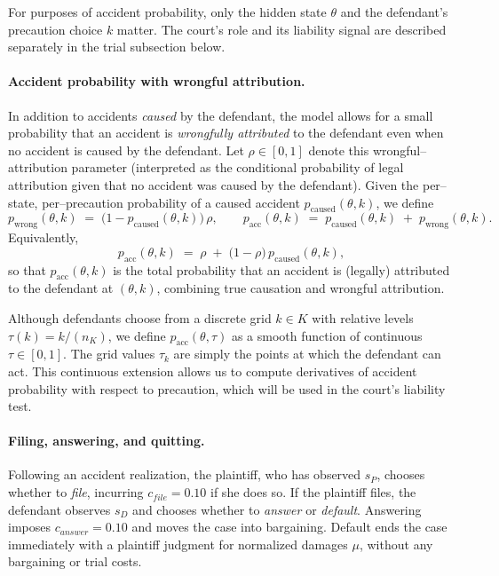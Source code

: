 \documentclass{article}
\begin{document}
For purposes of accident probability, only the hidden state $\theta$ and the defendant’s precaution choice $k$ matter. The court’s role and its liability signal are described separately in the trial subsection below.

\paragraph{Accident probability with wrongful attribution.}
In addition to accidents \emph{caused} by the defendant, the model allows for a small probability that an accident is \emph{wrongfully attributed} to the defendant even when no accident is caused by the defendant. Let $\rho\in[0,1]$ denote this wrongful–attribution parameter (interpreted as the conditional probability of legal attribution given that no accident was caused by the defendant). Given the per–state, per–precaution probability of a caused accident $p_{\mathrm{caused}}(\theta,k)$, we define
\[
p_{\mathrm{wrong}}(\theta,k)\;=\;\bigl(1 - p_{\mathrm{caused}}(\theta,k)\bigr)\,\rho,
\qquad
p_{\mathrm{acc}}(\theta,k)\;=\;p_{\mathrm{caused}}(\theta,k)\;+\;p_{\mathrm{wrong}}(\theta,k).
\]
Equivalently,
\[
p_{\mathrm{acc}}(\theta,k)
\;=\;\rho \;+\; \bigl(1-\rho\bigr)\,p_{\mathrm{caused}}(\theta,k),
\]
so that $p_{\mathrm{acc}}(\theta,k)$ is the total probability that an accident is (legally) attributed to the defendant at $(\theta,k)$, combining true causation and wrongful attribution.

Although defendants choose from a discrete grid $k \in K$ with relative levels $\tau(k)=k/(n_K)$, we define $p_{\mathrm{acc}}(\theta,\tau)$ as a smooth function of continuous $\tau\in[0,1]$. The grid values $\tau_k$ are simply the points at which the defendant can act. This continuous extension allows us to compute derivatives of accident probability with respect to precaution, which will be used in the court’s liability test.

\paragraph{Filing, answering, and quitting.}
Following an accident realization, the plaintiff, who has observed $s_P$, chooses whether to \emph{file}, incurring $c_{file}=0.10$ if she does so. If the plaintiff files, the defendant observes $s_D$ and chooses whether to \emph{answer} or \emph{default}. Answering imposes $c_{answer}=0.10$ and moves the case into bargaining. Default ends the case immediately with a plaintiff judgment for normalized damages $\mu$, without any bargaining or trial costs.
\end{document}
